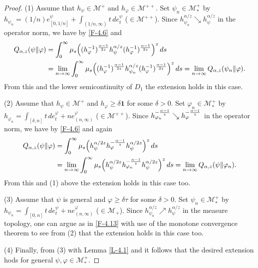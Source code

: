 \documentclass[12pt]{article}
\theoremstyle{definition}
\theoremstyle{remark}
\numberwithin{equation}{section}
\def\Me{\mathcal M}
\def\ffi{\varphi}
\def\1{\mathbf{1}}
\begin{document}
\begin{proof}
(1)\enspace
Assume that $h_\psi\in\Me^+$ and $h_\ffi\in\Me^{++}$. Set $\psi_n\in\Me_*^+$ by
$h_{\psi_n}=(1/n)e_{[0,1/n]}^\psi+\int_{(1/n,\infty)}t\,de_t^\psi$ ($\in\Me^{++}$). Since
$h_{\psi_n}^{\alpha/z}\searrow h_\psi^{\alpha/z}$ in the operator norm, we have by \eqref{F-4.6} and
\cite[Lemma 3.4]{fack1986generalized}
\begin{equation}\label{F-4.13}
\begin{aligned}
Q_{\alpha,z}(\psi\|\ffi)&=\int_0^\infty\mu_s\Bigl((h_\ffi^{-1})^{\alpha-1\over2z}h_\psi^{\alpha/z}
(h_\ffi^{-1})^{\alpha-1\over2z}\Bigr)^z\,ds \\
&=\lim_{n\to\infty}\int_0^\infty\mu_s\Bigl((h_\ffi^{-1})^{\alpha-1\over2z}h_{\psi_n}^{\alpha/z}
(h_\ffi^{-1})^{\alpha-1\over2z}\Bigr)^z\,ds
=\lim_{n\to\infty}Q_{\alpha,z}(\psi_n\|\ffi).
\end{aligned}
\end{equation}
From this and the lower semicontinuity of $D_1$ the extension holds in this case.

(2)\enspace
Assume that $h_\psi\in\Me^+$ and $h_\ffi\ge\delta\1$ for some $\delta>0$. Set $\ffi_n\in\Me_*^+$
by $h_{\ffi_n}=\int_{[\delta,n]}t\,de_t^\ffi+ne_{(n,\infty)}^\ffi$ ($\in\Me^{++}$). Since
$h_{\ffi_n}^{-{\alpha-1\over z}}\searrow h_\ffi^{-{\alpha-1\over z}}$ in the operator norm, we have by
\eqref{F-4.6} and \cite[Lemma 3.4]{fack1986generalized} again
\begin{align*}
Q_{\alpha,z}(\psi\|\ffi)&=\int_0^\infty\mu_s\Bigl(h_\psi^{\alpha/2z}h_\ffi^{-{\alpha-1\over z}}
h_\psi^{\alpha/2z}\Bigr)^z\,ds \\
&=\lim_{n\to\infty}\int_0^\infty\mu_s\Bigl(h_\psi^{\alpha/2z}h_{\ffi_n}^{-{\alpha-1\over z}}
h_\psi^{\alpha/2z}\Bigr)^z\,ds
=\lim_{n\to\infty}Q_{\alpha,z}(\psi\|\ffi_n).
\end{align*}
From this and (1) above the extension holds in this case too.

(3)\enspace
Assume that $\psi$ is general and $\ffi\ge\delta\tau$ for some $\delta>0$. Set $\psi_n\in\Me_*^+$
by $h_{\psi_n}=\int_{[0,n]}t\,de_t^\psi+ne_{(n,\infty)}^\ffi$ ($\in\Me_+$). Since
$h_{\psi_n}^{\alpha/z}\nearrow h_\psi^{\alpha/z}$ in the measure topology, one can argue as in \eqref{F-4.13}
with use of the monotone convergence theorem to see from (2) that the extension holds in this case too.

(4)\enspace
Finally, from (3) with Lemma \ref{L-4.1} and \cite[Corollary 2.8(3)]{hiai2021quantum} it follows that
the desired extension hods for general $\psi,\ffi\in\Me_*^+$.
\end{proof}
\end{document}
